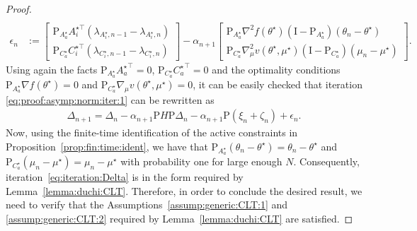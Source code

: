 \documentclass[11pt,a4paper]{article}
\theoremstyle{definition}
\begin{document}
\begin{proof}
\begin{align*}
     \\
    \epsilon_n &:= \begin{bmatrix} \text{P}_{A^\star_a} A_i^{\star\top} (\lambda_{A^\star_i,n-1} - \lambda_{A^\star_i,n}) \\ \text{P}_{C^\star_a} C_i^{\star\top} (\lambda_{C^\star_i,n-1} - \lambda_{C^\star_i,n}) \end{bmatrix} - \alpha_{n+1} \begin{bmatrix} \text{P}_{A^\star_a}\nabla^2 {f}(\theta^\star)(\text{I}- \text{P}_{A^\star_a}) (\theta_{n} - \theta^\star) \\ \text{P}_{C^\star_a} \nabla_\mu^2 v(\theta^\star,\mu^\star)(\text{I}- \text{P}_{C^\star_a})(\mu_{n}-\mu^\star) \end{bmatrix}.
\end{align*}
Using again the facts $\text{P}_{A_a^\star} {A_a^\star}^\top = 0$, $\text{P}_{C_a^\star} {C_a^\star}^\top = 0$ and the optimality conditions $\text{P}_{A_a^\star} \nabla f(\theta^\star) = 0$ and $\text{P}_{C_a^\star} \nabla_\mu v(\theta^\star,\mu^\star) = 0$, it can be easily checked that iteration \eqref{eq:proof:asymp:norm:iter:1} can be rewritten as
\begin{align}
\label{eq:iteration:Delta}
    \Delta_{n+1} = \Delta_n - \alpha_{n+1} \text{P} H \text{P} \Delta_n - \alpha_{n+1} \text{P} (\xi_n + \zeta_n) + \epsilon_n.
\end{align}
Now, using the finite-time identification of the active constraints in Proposition~\ref{prop:fin:time:ident}, we have that $\text{P}_{A^\star_a}(\theta_{n} - \theta^\star) = \theta_{n} - \theta^\star$ and $\text{P}_{C^\star_a}(\mu_{n}-\mu^\star) = \mu_{n}-\mu^\star$ with probability one for large enough $N$. Consequently, iteration~\eqref{eq:iteration:Delta} is in the form required by Lemma~\ref{lemma:duchi:CLT}. Therefore, in order to conclude the desired result, we need to verify that the Assumptions~\ref{assump:generic:CLT:1} and \ref{assump:generic:CLT:2} required by Lemma~\ref{lemma:duchi:CLT} are satisfied. 


\end{proof}
\end{document}
